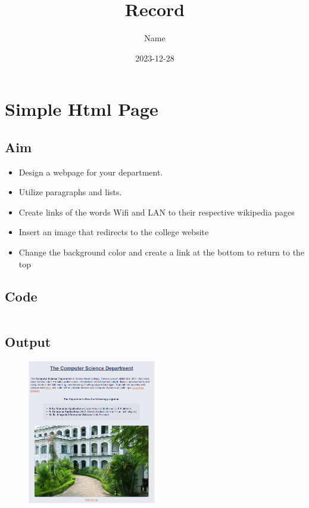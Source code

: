 \documentclass{article}
\title{Record}
\author{Name}
\date{2023-12-28}
\begin{document}

\newpage
\tableofcontents
\newpage

\section{Simple Html Page}
\subsection{Aim}
\begin{itemize}
	\item Design a webpage for your department.
	\item Utilize paragraphs and lists.
	\item Create links of the words Wifi and LAN to their respective wikipedia pages
	\item Insert an image that redirects to the college website
	\item Change the background color and create a link at the bottom to return to the top
\end{itemize}

\subsection{Code}
\inputminted[frame=lines, linenos, breaklines, breakanywhere, numberblanklines=false]{html}{./prog_1/index.html}

\newpage
\subsection{Output}
\begin{figure}[h!]
	\centering
	\includegraphics[width=0.5\textwidth]{./Assets/p0101.png}
\end{figure}
\newpage
\end{document}
